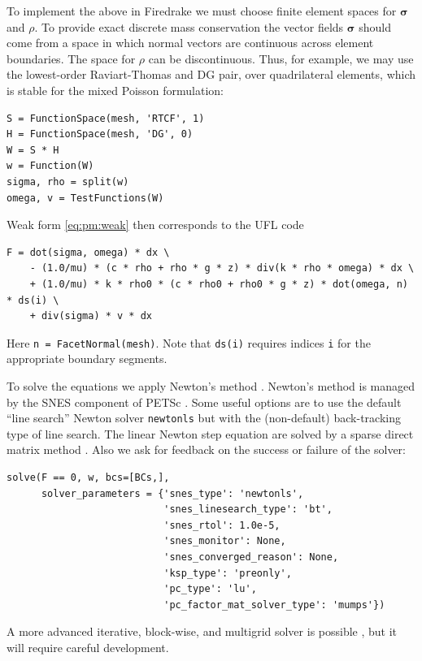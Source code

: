 \documentclass[11pt]{amsart}
\newcommand{\bsigma}{\bm{\sigma}}
\begin{document}
To implement the above in Firedrake we must choose finite element spaces for $\bsigma$ and $\rho$.  To provide exact discrete mass conservation the vector fields $\bsigma$ should come from a space in which normal vectors are continuous across element boundaries.  The space for $\rho$ can be discontinuous.  Thus, for example, we may use the lowest-order Raviart-Thomas and DG pair, over quadrilateral elements, which is stable for the mixed Poisson formulation:
\begin{Verbatim}[fontsize=\small,frame=lines]
S = FunctionSpace(mesh, 'RTCF', 1)
H = FunctionSpace(mesh, 'DG', 0)
W = S * H
w = Function(W)
sigma, rho = split(w)
omega, v = TestFunctions(W)
\end{Verbatim}
Weak form \eqref{eq:pm:weak} then corresponds to the UFL code
\begin{Verbatim}[fontsize=\small,frame=lines]
F = dot(sigma, omega) * dx \
    - (1.0/mu) * (c * rho + rho * g * z) * div(k * rho * omega) * dx \
    + (1.0/mu) * k * rho0 * (c * rho0 + rho0 * g * z) * dot(omega, n) * ds(i) \
    + div(sigma) * v * dx
\end{Verbatim}
Here \verb|n = FacetNormal(mesh)|.  Note that \verb|ds(i)| requires indices \verb|i| for the appropriate boundary segments.

To solve the equations we apply Newton's method \citep{Kelley2003}.  Newton's method is managed by the SNES component of PETSc \citep{Balay2023}.  Some useful options are to use the default ``line search'' Newton solver \texttt{newtonls} but with the (non-default) back-tracking type of line search.  The linear Newton step equation are solved by a sparse direct matrix method \citep{Amestoy2001}.  Also we ask for feedback on the success or failure of the solver:
\begin{Verbatim}[fontsize=\small,frame=lines]
solve(F == 0, w, bcs=[BCs,],
      solver_parameters = {'snes_type': 'newtonls',
                           'snes_linesearch_type': 'bt',
                           'snes_rtol': 1.0e-5,
                           'snes_monitor': None,
                           'snes_converged_reason': None,
                           'ksp_type': 'preonly',
                           'pc_type': 'lu',
                           'pc_factor_mat_solver_type': 'mumps'})
\end{Verbatim}
A more advanced iterative, block-wise, and multigrid solver is possible \citep[e.g.][]{Bueler2021}, but it will require careful development.
\end{document}

